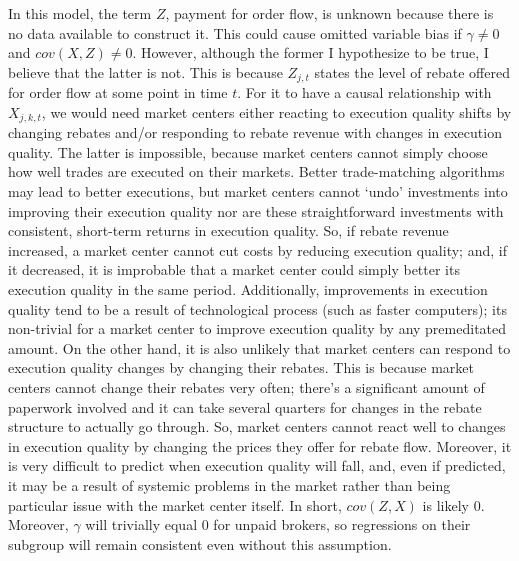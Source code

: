 \documentclass[12pt,a4paper]{article}
\begin{document}
	In this model, the term $Z$, payment for order flow, is unknown because there is no data available to construct it. This could cause omitted variable bias if $\gamma \neq 0$ and $cov(X, Z) \neq 0$. However, although the former I hypothesize to be true, I believe that the latter is not. This is because $Z_{j,  t}$ states the level of rebate offered for order flow at some point in time $t$. For it to have a causal relationship with $X_{j, k,  t}$, we would need market centers either reacting to execution quality shifts by changing rebates and/or responding to rebate revenue with changes in execution quality. The latter is impossible, because market centers cannot simply choose how well trades are executed on their markets. Better trade-matching algorithms may lead to better executions, but market centers cannot `undo' investments into improving their execution quality nor are these straightforward investments with consistent, short-term returns in execution quality. So, if rebate revenue increased, a market center cannot cut costs by reducing execution quality; and, if it decreased, it is improbable that a market center could simply better its execution quality in the same period. Additionally, improvements in execution quality tend to be a result of technological process (such as faster computers); its non-trivial for a market center to improve execution quality by any premeditated amount. On the other hand, it is also unlikely that market centers can respond to execution quality changes by changing their rebates. This is because market centers cannot change their rebates very often; there's a significant amount of paperwork involved and it can take several quarters for changes in the rebate structure to actually go through. So, market centers cannot react well to changes in execution quality by changing the prices they offer for rebate flow. Moreover, it is very difficult to predict when execution quality will fall, and, even if predicted, it may be a result of systemic problems in the market rather than being particular issue with the market center itself. In short, $cov(Z, X)$ is likely $0$. Moreover, $\gamma$ will trivially equal $0$ for unpaid brokers, so regressions on their subgroup will remain consistent even without this assumption. 
	
\end{document}
